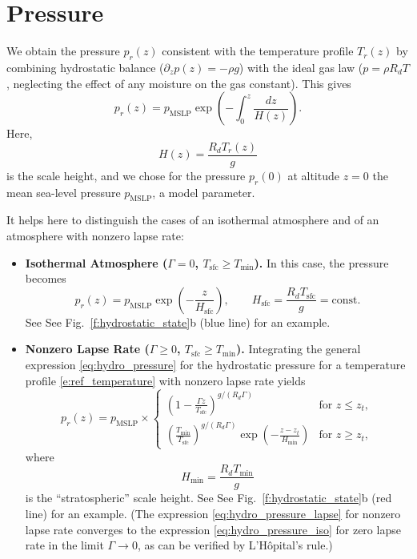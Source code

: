 \documentclass{report}
\begin{document}
\section{Pressure}

We obtain the pressure $p_r(z)$ consistent with the temperature profile $T_r(z)$ by combining hydrostatic balance ($\partial_z p(z) = - \rho g$) with the ideal gas law ($p=\rho R_d T$, neglecting the effect of any moisture on the gas constant). This gives
\begin{equation}\label{eq:hydro_pressure}
p_r(z) = p_{\mathrm{MSLP}} \exp\left(-\int_0^z \frac{dz}{H(z)} \right).
\end{equation}
Here,
\begin{equation}
H(z)  = \frac{R_d T_r(z)}{g}
\end{equation}
is the scale height, and we chose for the pressure $p_r(0)$ at altitude $z=0$ the mean sea-level pressure $p_{\mathrm{MSLP}}$, a model parameter. 

It helps here to distinguish the cases of an isothermal atmosphere and of an atmosphere with nonzero lapse rate:
\begin{itemize}
\item \textbf{Isothermal Atmosphere ($\Gamma = 0$, $T_{\mathrm{sfc}} \ge T_{\min}$).} 
In this case, the pressure becomes 
\begin{equation}\label{eq:hydro_pressure_iso}
    p_r(z) = p_{\mathrm{MSLP}} \exp \left(-\frac{z}{H_{\mathrm{sfc}}} \right), \qquad H_{\mathrm{sfc}} = \frac{R_d T_{\mathrm{sfc}}}{g} = \mathrm{const}.
\end{equation}
See See Fig.~\ref{f:hydrostatic_state}b (blue line) for an example.

\item \textbf{Nonzero Lapse Rate ($\Gamma \ge 0$, $T_{\mathrm{sfc}} \ge T_{\min}$).}
Integrating the general expression \eqref{eq:hydro_pressure} for the hydrostatic pressure for a temperature profile \eqref{e:ref_temperature} with nonzero lapse rate yields
\begin{equation}\label{eq:hydro_pressure_lapse}
p_r(z) = p_{\mathrm{MSLP}} \times
\begin{cases}
\left(1 - \frac{\Gamma z}{T_{\mathrm{sfc}}} \right)^{g/(R_d \Gamma)} & \text{for } z \le z_t, \\[1.5ex]
  \left(\frac{T_{\min}}{T_{\mathrm{sfc}}} \right)^{g/(R_d \Gamma)}
 \exp  \left(-\frac{z - z_t}{H_{\min}} \right) & \text{for } z\ge z_t, 
\end{cases}
\end{equation}
where 
\begin{equation}
H_{\min} = \frac{R_d T_{\min}}{g}
\end{equation}
is the ``stratospheric'' scale height. See See Fig.~\ref{f:hydrostatic_state}b (red line) for an example. (The expression \eqref{eq:hydro_pressure_lapse} for nonzero lapse rate converges to the expression \eqref{eq:hydro_pressure_iso} for zero lapse rate in the limit $\Gamma \to 0$, as can be verified by L'H{\^o}pital's rule.)
\end{itemize}
\end{document}
